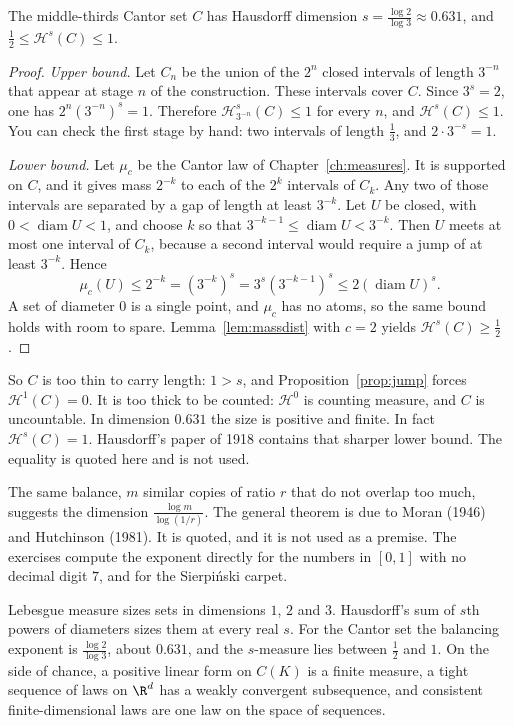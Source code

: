 \begin{theorem}\label{thm:cantordim}
The middle-thirds Cantor set $C$ has Hausdorff dimension $s=\frac{\log 2}{\log 3}\approx 0.631$, and $\frac12\le\mathcal H^s(C)\le 1$.
\end{theorem}
\begin{proof}
\emph{Upper bound.} Let $C_n$ be the union of the $2^n$ closed intervals of length $3^{-n}$ that appear at stage $n$ of the construction.
These intervals cover $C$. Since $3^s=2$, one has $2^n(3^{-n})^s=1$. Therefore $\mathcal H^s_{3^{-n}}(C)\le 1$ for every $n$, and
$\mathcal H^s(C)\le 1$. You can check the first stage by hand: two intervals of length $\frac13$, and $2\cdot 3^{-s}=1$.

\emph{Lower bound.} Let $\mu_c$ be the Cantor law of Chapter~\ref{ch:measures}. It is supported on $C$, and it gives mass $2^{-k}$ to each of
the $2^k$ intervals of $C_k$. Any two of those intervals are separated by a gap of length at least $3^{-k}$. Let $U$ be closed, with
$0<\operatorname{diam}U<1$, and choose $k$ so that $3^{-k-1}\le\operatorname{diam}U<3^{-k}$. Then $U$ meets at most one interval of $C_k$, because a second interval
would require a jump of at least $3^{-k}$. Hence
\[\mu_c(U)\le 2^{-k}=(3^{-k})^s=3^s(3^{-k-1})^s\le 2(\operatorname{diam}U)^s.\]
A set of diameter $0$ is a single point, and $\mu_c$ has no atoms, so the same bound holds with room to spare. Lemma~\ref{lem:massdist} with
$c=2$ yields $\mathcal H^s(C)\ge\frac12$.
\end{proof}

So $C$ is too thin to carry length: $1>s$, and Proposition~\ref{prop:jump} forces $\mathcal H^1(C)=0$. It is too thick to be counted:
$\mathcal H^0$ is counting measure, and $C$ is uncountable. In dimension $0.631$ the size is positive and finite. In fact $\mathcal H^s(C)=1$.
Hausdorff's paper of 1918 contains that sharper lower bound. The equality is quoted here and is not used.

The same balance, $m$ similar copies of ratio $r$ that do not overlap too much, suggests the dimension $\frac{\log m}{\log(1/r)}$. The general
theorem is due to Moran (1946) and Hutchinson (1981). It is quoted, and it is not used as a premise. The exercises compute the exponent
directly for the numbers in $[0,1]$ with no decimal digit $7$, and for the Sierpi\'nski carpet.

\begin{beauty}
Lebesgue measure sizes sets in dimensions $1$, $2$ and $3$. Hausdorff's sum of $s$th powers of diameters sizes them at every real $s$. For
the Cantor set the balancing exponent is $\frac{\log 2}{\log 3}$, about $0.631$, and the $s$-measure lies between $\frac12$ and $1$. On the
side of chance, a positive linear form on $C(K)$ is a finite measure, a tight sequence of laws on $\R^d$ has a weakly convergent subsequence,
and consistent finite-dimensional laws are one law on the space of sequences.
\end{beauty}

